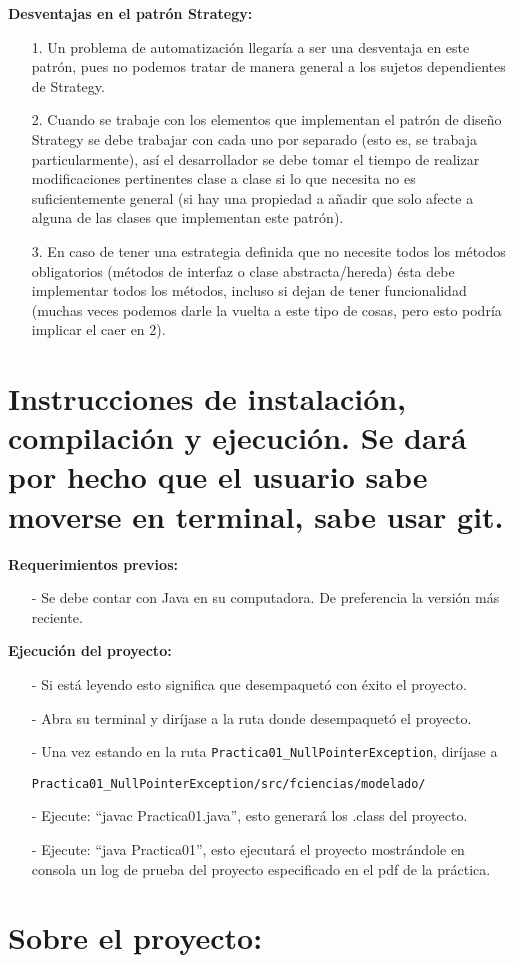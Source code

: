 \documentclass{article}
\newcommand{\code}[1]{\textcolor{white!25!black}{\texttt{#1}}}
\begin{document}
\textbf{Desventajas en el patrón Strategy:}
\begin{itemize}
\item[1.] Un problema de automatización llegaría a ser una desventaja en este patrón, pues no podemos tratar de manera general a los sujetos dependientes de Strategy.
\item[2.] Cuando se trabaje con los elementos que implementan el patrón de diseño Strategy se debe trabajar con cada uno por separado (esto es, se trabaja particularmente), así el desarrollador se debe tomar el tiempo de realizar modificaciones pertinentes clase a clase si lo que necesita no es suficientemente general (si hay una propiedad a añadir que solo afecte a alguna de las clases que implementan este patrón).
\item[3.] En caso de tener una estrategia definida que no necesite todos los métodos obligatorios (métodos de interfaz o clase abstracta/hereda) ésta debe implementar todos los métodos, incluso si dejan de tener funcionalidad (muchas veces podemos darle la vuelta a este tipo de cosas, pero esto podría implicar el caer en 2).
\end{itemize}

\section*{Instrucciones de instalación, compilación y ejecución. Se dará por hecho que el usuario sabe moverse en terminal, sabe usar git.}

\textbf{Requerimientos previos:}
\begin{itemize}
\item[-] Se debe contar con Java en su computadora. De preferencia la versión más reciente.
\end{itemize}

\textbf{Ejecución del proyecto:}
\begin{itemize}
\item[-] Si está leyendo esto significa que desempaquetó con éxito el proyecto.
\item[-] Abra su terminal y diríjase a la ruta donde desempaquetó el proyecto.
\item[-] Una vez estando en la ruta \code{Practica01\_NullPointerException}, diríjase a

  \code{Practica01\_NullPointerException/src/fciencias/modelado/}
\item[-] Ejecute: “javac Practica01.java”, esto generará los .class del proyecto.
\item[-] Ejecute: “java Practica01”, esto ejecutará el proyecto mostrándole
 en consola un log de prueba del proyecto especificado en el pdf de la práctica.
\end{itemize}

\section*{Sobre el proyecto:}
\end{document}
